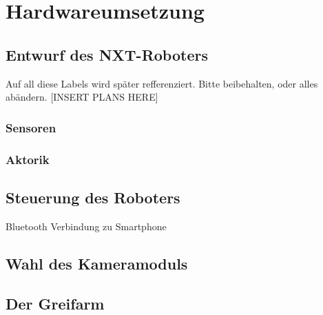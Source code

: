 \chapter{Hardwareumsetzung}
\section{Entwurf des NXT-Roboters}


Auf all diese Labels wird später refferenziert. Bitte beibehalten, oder alles abändern.
[INSERT PLANS HERE]
\subsection{Sensoren}
\subsection{Aktorik}

\section{Steuerung des Roboters}
Bluetooth Verbindung zu Smartphone

\section{Wahl des Kameramoduls}
\label{sec:Kamera}

\section{Der Greifarm}
\label{sec:Greifarm} 
